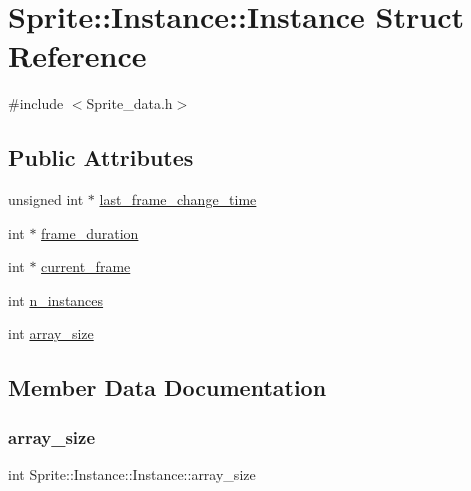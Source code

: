 \hypertarget{struct_sprite_1_1_instance_1_1_instance}{}\section{Sprite\+:\+:Instance\+:\+:Instance Struct Reference}
\label{struct_sprite_1_1_instance_1_1_instance}


{\ttfamily \#include $<$Sprite\+\_\+data.\+h$>$}

\subsection*{Public Attributes}
\begin{DoxyCompactItemize}
\item 
unsigned int $\ast$ \mbox{\hyperlink{struct_sprite_1_1_instance_1_1_instance_aab54e07feda9e5123dcc08fa399729d1}{last\+\_\+frame\+\_\+change\+\_\+time}}
\item 
int $\ast$ \mbox{\hyperlink{struct_sprite_1_1_instance_1_1_instance_aebb6497e9b2b06edaa5ed76ca9d4e56a}{frame\+\_\+duration}}
\item 
int $\ast$ \mbox{\hyperlink{struct_sprite_1_1_instance_1_1_instance_acddfb8c529c9ce317a744f80c5c755f9}{current\+\_\+frame}}
\item 
int \mbox{\hyperlink{struct_sprite_1_1_instance_1_1_instance_aa8dc1f3737a764d3f3198d3cb4a6181c}{n\+\_\+instances}}
\item 
int \mbox{\hyperlink{struct_sprite_1_1_instance_1_1_instance_a8dd4a6ce6158026470a6cb594b16b3a7}{array\+\_\+size}}
\end{DoxyCompactItemize}


\subsection{Member Data Documentation}
\mbox{\label{struct_sprite_1_1_instance_1_1_instance_a8dd4a6ce6158026470a6cb594b16b3a7}} 
\subsubsection{\texorpdfstring{array\+\_\+size}{array\_size}}
{\footnotesize\ttfamily int Sprite\+::\+Instance\+::\+Instance\+::array\+\_\+size}

